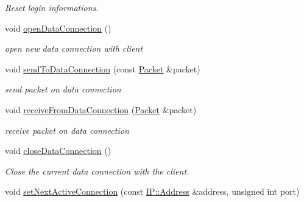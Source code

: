 \begin{DoxyCompactItemize}
\begin{DoxyCompactList}\small\item\em Reset login informations. \end{DoxyCompactList}\item 
\hypertarget{class_f_t_p_1_1_client_a027ed05405359ceb55ed5c6a7205ac41}{void \hyperlink{class_f_t_p_1_1_client_a027ed05405359ceb55ed5c6a7205ac41}{open\-Data\-Connection} ()}\label{class_f_t_p_1_1_client_a027ed05405359ceb55ed5c6a7205ac41}

\begin{DoxyCompactList}\small\item\em open new data connection with client \end{DoxyCompactList}\item 
\hypertarget{class_f_t_p_1_1_client_af278600020f84005d320054c55f2d260}{void \hyperlink{class_f_t_p_1_1_client_af278600020f84005d320054c55f2d260}{send\-To\-Data\-Connection} (const \hyperlink{class_f_t_p_1_1_packet}{Packet} \&packet)}\label{class_f_t_p_1_1_client_af278600020f84005d320054c55f2d260}

\begin{DoxyCompactList}\small\item\em send packet on data connection \end{DoxyCompactList}\item 
\hypertarget{class_f_t_p_1_1_client_a8fccfc0518176fb246308f2fb6bc3d62}{void \hyperlink{class_f_t_p_1_1_client_a8fccfc0518176fb246308f2fb6bc3d62}{receive\-From\-Data\-Connection} (\hyperlink{class_f_t_p_1_1_packet}{Packet} \&packet)}\label{class_f_t_p_1_1_client_a8fccfc0518176fb246308f2fb6bc3d62}

\begin{DoxyCompactList}\small\item\em receive packet on data connection \end{DoxyCompactList}\item 
\hypertarget{class_f_t_p_1_1_client_ad8c92ae82b9371bc6da087c77ef0d9d9}{void \hyperlink{class_f_t_p_1_1_client_ad8c92ae82b9371bc6da087c77ef0d9d9}{close\-Data\-Connection} ()}\label{class_f_t_p_1_1_client_ad8c92ae82b9371bc6da087c77ef0d9d9}

\begin{DoxyCompactList}\small\item\em Close the current data connection with the client. \end{DoxyCompactList}\item 
\hypertarget{class_f_t_p_1_1_client_a140d72957c3ee4ed2ecc91bd21ce0c66}{void \hyperlink{class_f_t_p_1_1_client_a140d72957c3ee4ed2ecc91bd21ce0c66}{set\-Next\-Active\-Connection} (const \hyperlink{class_f_t_p_1_1_i_p_1_1_address}{I\-P\-::\-Address} \&address, unsigned int port)}\label{class_f_t_p_1_1_client_a140d72957c3ee4ed2ecc91bd21ce0c66}


\end{DoxyCompactItemize}
